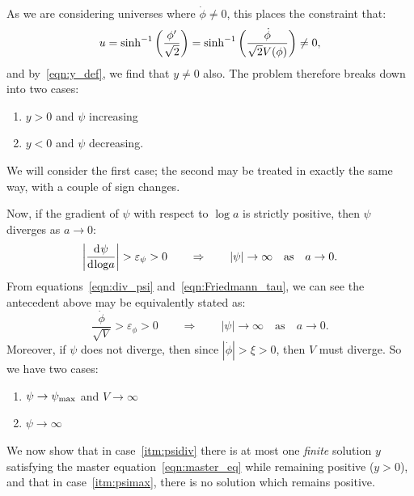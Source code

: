 As we are considering universes where \(\dot{\phi}\ne 0\), this places the constraint that:
%
\begin{equation}
  u 
  = 
  \sinh^{-1}\left(\frac{{{\phi}^\prime}}{\sqrt 2}\right) 
  = 
  \sinh^{-1}\left(\frac{\dot\phi}{\sqrt 2 V(\phi)}\right)
  \ne 
  0,
\end{equation}
%
and by~\eqref{eqn:y_def}, we find that \(y\ne0\) also.  The problem therefore breaks down into two cases: 
%
\begin{enumerate}
  \item \(y>0\) and \(\psi\) increasing
  \item \(y<0\) and \(\psi\) decreasing.
\end{enumerate}
%
We will consider the first case; the second may be treated in exactly the same way, with a couple of sign changes.  



Now, if the gradient of \(\psi\) with respect to \(\log a\) is strictly positive, then \(\psi\) diverges as \(a\to0\):
\begin{equation}
  \left| \frac{\operatorname{d}^{}\!{\psi}}{\operatorname{d}^{}\!{\log} a}\right|  > \varepsilon_\psi > 0 \qquad \Rightarrow \qquad |\psi| \to  \infty \quad\text{as}\quad a \to 0.
  \label{eqn:diverging_psi}
\end{equation}
From equations~\eqref{eqn:div_psi} and~\eqref{eqn:Friedmann_tau}, we can see the antecedent above may be equivalently stated as: 
\begin{equation}
  \frac{\dot\phi}{\sqrt{V}} > \varepsilon_\phi > 0 \qquad \Rightarrow \qquad |\psi| \to  \infty \quad\text{as}\quad a \to 0.
  \label{eqn:diverging_phi}
\end{equation}
Moreover, if \(\psi\) does not diverge, then since \({|\dot\phi|>\xi>0}\), then \(V\) must diverge. So we have two cases:
\begin{enumerate}
  \item \(\psi \to \psi_{\mathrm{max}}\) and \(V\to\infty\)\label{itm:psimax}
  \item \(\psi \to \infty\)\label{itm:psidiv}
\end{enumerate}
We now show that in case~\ref{itm:psidiv} there is at most one {\em finite\/} solution \(y\) satisfying the master equation~\eqref{eqn:master_eq} while remaining positive (\(y>0\)), and that in case~\ref{itm:psimax}, there is no solution which remains positive.

